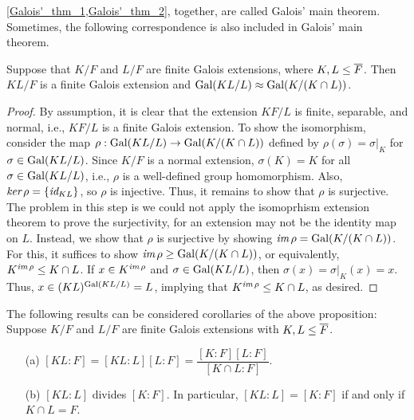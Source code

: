 \cref{Galois'_thm_1,Galois'_thm_2}, together, are called Galois' main theorem.
Sometimes, the following correspondence is also included in Galois' main theorem.
\begin{prop}
    Suppose that $K/F$ and $L/F$ are finite Galois extensions, where $K, L\leq\overline{F}$.
    Then $KL/F$ is a finite Galois extension and ${\textrm{Gal}({KL/L})}\approx{\textrm{Gal}({K/(K\cap L)})}$.
\end{prop}
\begin{proof}
    By assumption, it is clear that the extension $KF/L$ is finite, separable, and normal, i.e., $KF/L$ is a finite Galois extension.
    To show the isomorphism, consider the map $\rho: {\textrm{Gal}({KL/L})}\rightarrow{\textrm{Gal}({K/(K\cap L)})}$ defined by $\rho(\sigma)=\sigma|_K$ for $\sigma\in{\textrm{Gal}({KL/L})}$.
    Since $K/F$ is a normal extension, $\sigma(K)=K$ for all $\sigma\in{\textrm{Gal}({KL/L})}$, i.e., $\rho$ is a well-defined group homomorphism.
    Also, $\textit{ker\,}\rho=\{\textit{id}_{KL}\}$, so $\rho$ is injective.
    Thus, it remains to show that $\rho$ is surjective.
    \color{magenta}The problem in this step is we could not apply the isomoprhism extension theorem to prove the surjectivity, for an extension may not be the identity map on $L$. \color{black}
    Instead, we show that $\rho$ is surjective by showing $\textit{im\,}\rho={\textrm{Gal}({K/(K\cap L)})}$.
    For this, it suffices to show $\textit{im\,}\rho\geq{\textrm{Gal}({K/(K\cap L)})}$, or equivalently, $K^{\textit{im\,}\rho}\leq K\cap L$.
    If $x\in K^{\textit{im\,}\rho}$ and $\sigma\in{\textrm{Gal}({KL/L})}$, then $\sigma(x)=\sigma|_K(x)=x$.
    Thus, $x\in(KL)^{\textrm{Gal}({KL/L})}=L$, implying that $K^{\textit{im\,}\rho}\leq K\cap L$, as desired.
\end{proof}
\begin{rmk}
    The following results can be considered corollaries of the above proposition: Suppose $K/F$ and $L/F$ are finite Galois extensions with $K, L\leq \overline{F}$.
    \begin{enumerate}
        \item[(a)]
        {
                $[KL:F]=[KL:L][L:F]=\dfrac{[K:F][L:F]}{[K\cap L:F]}$.
        }
        \item[(b)]
        {
                $[KL:L]$ divides $[K:F]$.
                In particular, $[KL:L]=[K:F]$ if and only if $K\cap L=F$.
        }
    \end{enumerate}
\end{rmk}
